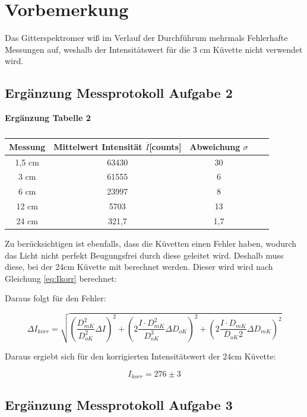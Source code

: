 \section{Vorbemerkung}
Das Gitterspektromer wiß im Verlauf der Durchführum mehrmals Fehlerhafte Messungen auf, weshalb der Intensitätswert für die 3 cm Küvette nicht verwendet wird.

\subsection{Ergänzung Messprotokoll Aufgabe 2}
\begin{table}[h!]
    \centering
    \textbf{Ergänzung Tabelle 2} \\ \smallskip
    \begin{tabular}{c c c c c}
        
        \toprule 
        Messung & Mittelwert Intensität $\overline{I}$[counts] & Abweichung $\sigma$\\
        \midrule
        1,5 cm & 63430 & 30 \\
        3 cm & 61555 & 6 \\
        6 cm & 23997 & 8 \\
        12 cm & 5703 & 13 \\
        24 cm & 321,7 & 1,7 \\
        \bottomrule
        
    \end{tabular}
    \caption{}
\end{table}

Zu berücksichtigen ist ebenfalls, dass die Küvetten einen
Fehler haben, wodurch das Licht nicht perfekt Beugungsfrei
durch diese geleitet wird. Deshalb muss diese, bei der 24cm Küvette mit berechnet werden. Dieser wird wird nach Gleichung \ref{eq:Ikorr} berechnet:

Daraus folgt für den Fehler:

\begin{equation}
    \Delta I_{korr} = \sqrt{(\frac{D_{mK}^2}{D_{oK}^2} \Delta I)^2 + (2\frac{I \cdot D_{mK}^2}{D_{oK}^3}\Delta D_{oK})^2 + (2 \frac{I \cdot D_{mK}}{D_{oK}2} \Delta D_{mK})^2}
\end{equation}

Daraus ergiebt sich für den korrigierten Intensitätswert der 24cm Küvette:

\[ I_{korr} = 276 \pm 3 \]

\subsection{Ergänzung Messprotokoll Aufgabe 3}

